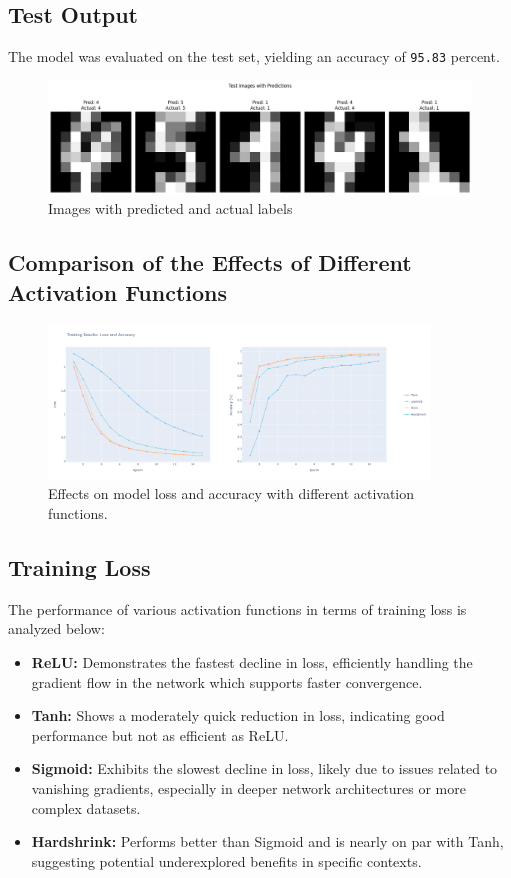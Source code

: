 \documentclass[11pt,a4paper]{article}
\begin{document}
\subsection{Test Output}
The model was evaluated on the test set, yielding an accuracy of \texttt{95.83} percent.
\begin{figure}[ht]
    \centering
    \includegraphics[width=1\textwidth]{images/test_images.png}
    \caption{Images with predicted and actual labels}
    \label{fig:test_images}
\end{figure}

\subsection{Comparison of the Effects of Different Activation Functions}
\begin{figure}[ht]
    \centering
    \includegraphics[width=0.9\textwidth]{images/activation_function_loss.png}
    \caption{Effects on model loss and accuracy with different activation functions.}
    \label{fig:activation_function_loss}
\end{figure}

\subsection*{Training Loss}
The performance of various activation functions in terms of training loss is analyzed below:

\begin{itemize}
    \item \textbf{ReLU:} Demonstrates the fastest decline in loss, efficiently handling the gradient flow in the network which supports faster convergence.
    \item \textbf{Tanh:} Shows a moderately quick reduction in loss, indicating good performance but not as efficient as ReLU.
    \item \textbf{Sigmoid:} Exhibits the slowest decline in loss, likely due to issues related to vanishing gradients, especially in deeper network architectures or more complex datasets.
    \item \textbf{Hardshrink:} Performs better than Sigmoid and is nearly on par with Tanh, suggesting potential underexplored benefits in specific contexts.
\end{itemize}
\end{document}
